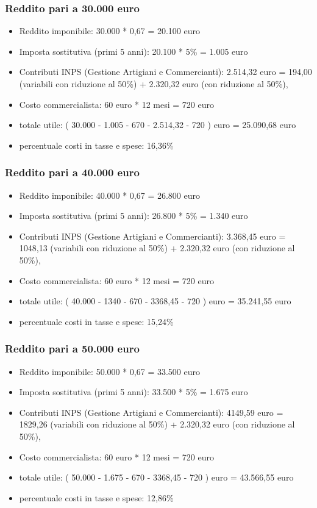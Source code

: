 \documentclass{article}
\begin{document}
\subsubsection{Reddito pari a 30.000 euro}
\begin{itemize}
    \item Reddito imponibile: 30.000 * 0,67 = 20.100 euro
    \item Imposta sostitutiva (primi 5 anni): 20.100 * 5\% = 1.005 euro
    \item Contributi INPS (Gestione Artigiani e Commercianti): 2.514,32 euro = 194,00 (variabili con riduzione al 50\%) + 2.320,32 euro (con riduzione al 50\%),
    \item Costo commercialista: 60 euro * 12 mesi = 720 euro
    \item totale utile: ( 30.000 - 1.005 - 670 - 2.514,32 - 720 ) euro = 25.090,68 euro
    \item percentuale costi in tasse e spese: 16,36\%
\end{itemize}

\subsubsection{Reddito pari a 40.000 euro}
\begin{itemize}
    \item Reddito imponibile: 40.000 * 0,67 = 26.800 euro
    \item Imposta sostitutiva (primi 5 anni): 26.800 * 5\% = 1.340 euro
    \item Contributi INPS (Gestione Artigiani e Commercianti): 3.368,45 euro = 1048,13 (variabili con riduzione al 50\%) + 2.320,32 euro (con riduzione al 50\%),
    \item Costo commercialista: 60 euro * 12 mesi = 720 euro
    \item totale utile: ( 40.000 - 1340 - 670 - 3368,45 - 720 ) euro = 35.241,55 euro
    \item percentuale costi in tasse e spese: 15,24\%
\end{itemize}

\subsubsection{Reddito pari a 50.000 euro}
\begin{itemize}
    \item Reddito imponibile: 50.000 * 0,67 = 33.500 euro
    \item Imposta sostitutiva (primi 5 anni): 33.500 * 5\% = 1.675 euro
    \item Contributi INPS (Gestione Artigiani e Commercianti): 4149,59 euro = 1829,26 (variabili con riduzione al 50\%) + 2.320,32 euro (con riduzione al 50\%),
    \item Costo commercialista: 60 euro * 12 mesi = 720 euro
    \item totale utile: ( 50.000 - 1.675 - 670 - 3368,45 - 720 ) euro = 43.566,55 euro
    \item percentuale costi in tasse e spese: 12,86\%
\end{itemize}
\end{document}
